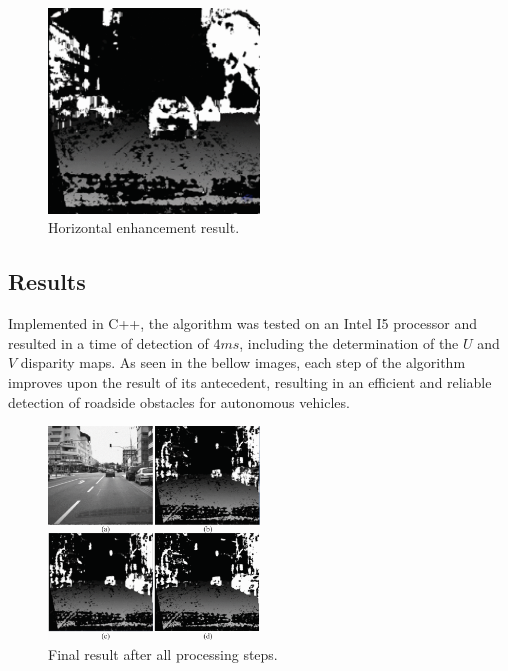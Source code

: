 \begin{figure}[H]
    \includegraphics[width=0.50\textwidth, height=0.45\textwidth]{resources/png/horizontal_enhance.png}
    \caption{Horizontal enhancement result.~\cite{withMain}~\label{figHoriz}}
\end{figure}

\subsection{Results}

Implemented in C++, the algorithm was tested on an Intel I5 processor and resulted in a time of detection of 
\(4ms\), including the determination of the \(U\) and \(V\) disparity maps. As seen in the bellow images, 
each step of the algorithm improves upon the result of its antecedent, resulting in an efficient and reliable
detection of roadside obstacles for autonomous vehicles. 

\begin{figure}[H]
    \includegraphics[width=0.50\textwidth, height=0.45\textwidth]{resources/png/final_result.png}
    \caption{Final result after all processing steps.~\cite{withMain}~\label{figSteps}}
\end{figure}